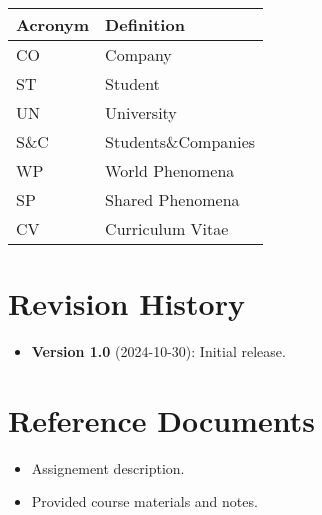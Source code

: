 \begin{table}[H]
    \centering
    \begin{longtable}{|l|p{}|}
        \hline
        \textbf{Acronym} & \textbf{Definition} \\
        \hline \hline
        CO               & Company             \\
        \hline
        ST               & Student             \\
        \hline
        UN               & University          \\
        \hline
        S\&C             & Students\&Companies \\
        \hline
        WP               & World Phenomena     \\
        \hline
        SP               & Shared Phenomena    \\
        \hline
        CV               & Curriculum Vitae    \\
        \hline
    \end{longtable}
\end{table}

\section{Revision History}
\label{sec:revision-history}%

\begin{itemize}
    \item \textbf{Version 1.0} (2024-10-30): Initial release.
\end{itemize}

\section{Reference Documents}
\label{sec:reference-documents}%

\begin{itemize}
    \item Assignement description.
    \item Provided course materials and notes.
\end{itemize}
